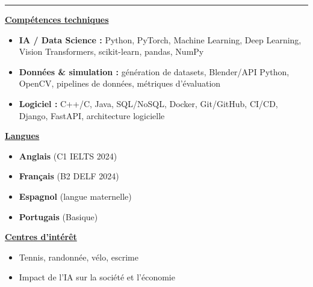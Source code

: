\documentclass[letterpaper,10pt]{article}
\begin{document}
  

\vspace{5pt}
\noindent\rule{\textwidth}{0.4pt}
\vspace{1pt}

\noindent
\begin{minipage}[t]{0.42\textwidth}
  \raggedright
  \textbf{\underline{Compétences techniques}}\\[-2pt]
  {\scriptsize
    \begin{itemize}[leftmargin=*,itemsep=1pt,parsep=0pt,topsep=0pt,partopsep=0pt]
      \item \textbf{IA / Data Science :} Python, PyTorch, Machine Learning, Deep Learning, Vision Transformers, scikit-learn, pandas, NumPy
      \item \textbf{Données \& simulation :} génération de datasets, Blender/API Python, OpenCV, pipelines de données, métriques d'évaluation
      \item \textbf{Logiciel :} C++/C, Java, SQL/NoSQL, Docker, Git/GitHub, CI/CD, Django, FastAPI, architecture logicielle
    \end{itemize}
  }
\end{minipage}\hfill
\begin{minipage}[t]{0.26\textwidth}
  \raggedright
  \textbf{\underline{Langues}}\\[-2pt]
  {\scriptsize
    \begin{itemize}[leftmargin=*,itemsep=0pt,parsep=0pt,topsep=0pt,partopsep=0pt]
      \item \textbf{Anglais} (C1 \textendash{} IELTS 2024)
      \item \textbf{Français} (B2 \textendash{} DELF 2024)
      \item \textbf{Espagnol} (langue maternelle)
      \item \textbf{Portugais} (Basique)
    \end{itemize}
  }
\end{minipage}\hfill
\begin{minipage}[t]{0.27\textwidth}
  \raggedright
  \textbf{\underline{Centres d'intérêt}}\\[-2pt]
  {\scriptsize
    \begin{itemize}[leftmargin=*,itemsep=1pt,parsep=0pt,topsep=0pt,partopsep=0pt]
      \item Tennis, randonnée, vélo, escrime
      \item Impact de l'IA sur la société et l'économie
    \end{itemize}
  }
\end{minipage}



\end{document}
